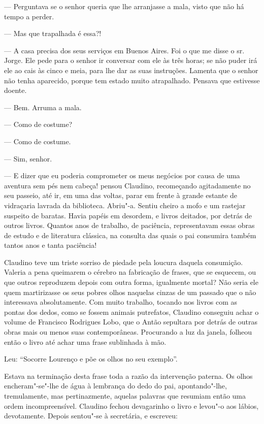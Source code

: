 --- Perguntava se o senhor queria que lhe arranjasse a mala, visto que
não há tempo a perder.

--- Mas que trapalhada é essa?!

--- A casa precisa dos seus serviços em Buenos Aires. Foi o que me disse
o sr. Jorge. Ele pede para o senhor ir conversar com ele às três horas;
se não puder irá ele ao cais às cinco e meia, para lhe dar as suas
instruções. Lamenta que o senhor não tenha aparecido, porque tem estado
muito atrapalhado. Pensava que estivesse doente.

--- Bem. Arruma a mala.

--- Como de costume?

--- Como de costume.

--- Sim, senhor.

--- E dizer que eu poderia comprometer os meus negócios por causa de uma
aventura sem pés nem cabeça! pensou Claudino, recomeçando agitadamente
no seu passeio, até ir, em uma das voltas, parar em frente à grande
estante de vidraçaria lavrada da biblioteca. Abriu"-a. Sentiu cheiro a
mofo e um rastejar suspeito de baratas. Havia papéis em desordem, e
livros deitados, por detrás de outros livros. Quantos anos de trabalho,
de paciência, representavam essas obras de estudo e de literatura
clássica, na consulta das quais o pai consumira também tantos anos e
tanta paciência!

Claudino teve um triste sorriso de piedade pela loucura daquela
consumição. Valeria a pena queimarem o cérebro na fabricação de frases,
que se esquecem, ou que outros reproduzem depois com outra forma,
igualmente mortal? Não seria ele quem martirizasse os seus pobres olhos
naquelas cinzas de um passado que o não interessava absolutamente. Com
muito trabalho, tocando nos livros com as pontas dos dedos, como se
fossem animais putrefatos, Claudino conseguiu achar o volume de
Francisco Rodrigues Lobo, que o Antão sepultara por detrás de outras
obras mais ou menos suas contemporâneas. Procurando a luz da janela,
folheou então o livro até achar uma frase sublinhada à mão.

Leu: ``Socorre Lourenço e põe os olhos no seu exemplo''.

Estava na terminação desta frase toda a razão da intervenção paterna. Os
olhos encheram"-se"-lhe de água à lembrança do dedo do pai, apontando"-lhe,
tremulamente, mas pertinazmente, aquelas palavras que resumiam então uma
ordem incompreensível. Claudino fechou devagarinho o livro e levou"-o aos
lábios, devotamente. Depois sentou"-se à secretária, e escreveu:

